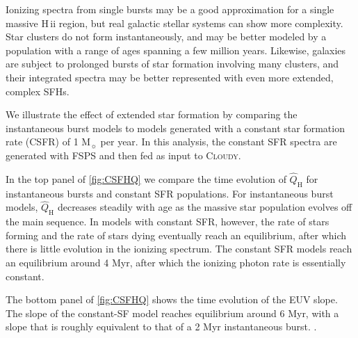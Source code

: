 \documentclass[linenumbers, tighten, trackchanges]{aastex61}%
\newcommand{\Fig}[1]{\autoref{fig:#1}}
\newcommand{\FSPS}{{\sc FSPS}\xspace}
\newcommand{\Cloudy}{\textsc{Cloudy}\xspace}
\newcommand\Msun{\ensuremath{\mathrm{M_{\sun}}}}
\newcommand{\hii}{H\,{\sc ii}\xspace}
\newcommand{\QHat}{\ensuremath{\hat{Q}_{\mathrm{H}}}}
\begin{document}
Ionizing spectra from single bursts may be a good approximation for a single massive \hii region, but real galactic stellar systems can show more complexity. Star clusters do not form instantaneously, and may be better modeled by a population with a range of ages spanning a few million years. Likewise, galaxies are subject to prolonged bursts of star formation involving many clusters, and their integrated spectra may be better represented with even more extended, complex SFHs. 

We illustrate the effect of extended star formation by comparing the instantaneous burst models to models generated with a constant star formation rate (CSFR) of 1 \Msun{} per year. In this analysis, the constant SFR spectra are generated with \FSPS and then fed as input to \Cloudy.  

In the top panel of \Fig{CSFHQ} we compare the time evolution of \QHat{} for instantaneous bursts and constant SFR populations. For instantaneous burst models, \QHat{} decreases steadily with age as the massive star population evolves off the main sequence. In models with constant SFR, however, the rate of stars forming and the rate of stars dying eventually reach an equilibrium, after which there is little evolution in the ionizing spectrum. The constant SFR models reach an equilibrium around 4 Myr, after which the ionizing photon rate is essentially constant. 

The bottom panel of \Fig{CSFHQ} shows the time evolution of the EUV slope. The slope of the constant-SF model  reaches equilibrium around 6 Myr, with a slope that is roughly equivalent to that of a 2 Myr instantaneous burst. .
\end{document}
